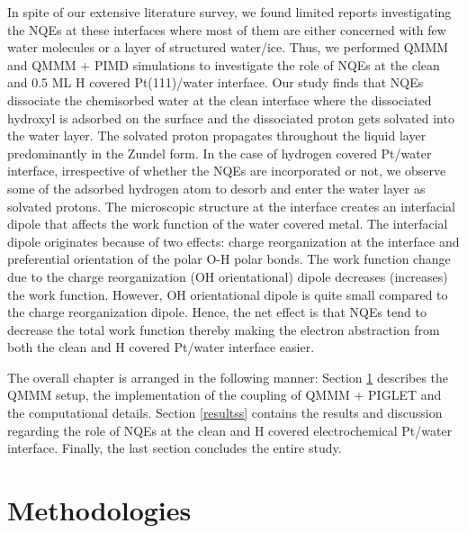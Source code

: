 In spite of our extensive literature survey, we found limited reports\cite{lan2022nuclear,fang2017simultaneous,lan2020ionization,litman2018decisive} investigating the NQEs at these interfaces where most of them are either concerned with few water molecules\cite{litman2018decisive} or a layer of structured water/ice\cite{yan2020nuclear}. Thus, we performed QMMM and QMMM $+$ PIMD simulations to investigate the role of NQEs at the clean and 0.5 ML H covered Pt(111)/water interface. Our study finds that NQEs dissociate the chemisorbed water at the clean interface where the dissociated hydroxyl is adsorbed on the surface and the dissociated proton gets solvated into the water layer. The solvated proton propagates throughout the liquid layer predominantly in the Zundel form. In the case of hydrogen covered Pt/water interface, irrespective of whether the NQEs are incorporated or not, we observe some of the adsorbed hydrogen atom to desorb and enter the water layer as solvated protons. The microscopic structure at the interface creates an interfacial dipole that affects the work function of the water covered metal. The interfacial dipole originates because of two effects: charge reorganization at the interface and preferential orientation of the polar O-H polar bonds. The work function change due to the charge reorganization (OH orientational) dipole decreases (increases) the work function. However, OH orientational dipole is quite small compared to the charge reorganization dipole. Hence, the net effect is that NQEs tend to decrease the total work function thereby making the electron abstraction from both the clean and H covered Pt/water interface easier. 

The overall chapter is arranged in the following manner: Section \ref{methodd} describes the QMMM setup, the implementation of the coupling of QMMM $+$ PIGLET and the computational details. Section \ref{resultss} contains the results and discussion regarding the role of NQEs at the clean and H covered electrochemical Pt/water interface. Finally, the last section concludes the entire study. 

\section{Methodologies}
\label{methodd}

